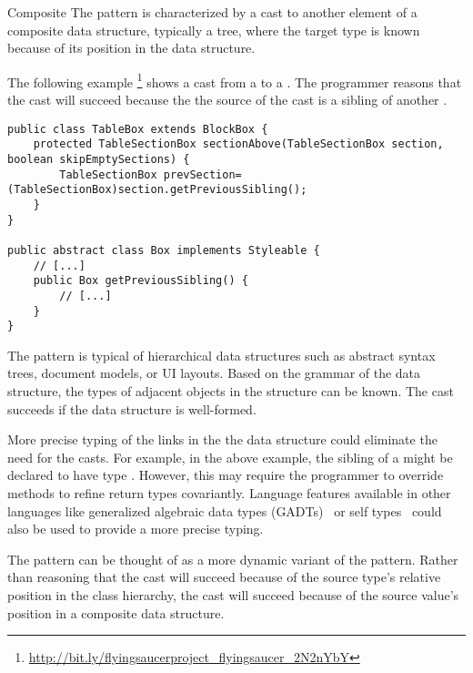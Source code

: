 \begin{pattern}{Composite}
The \thisp{} pattern is characterized by a cast to another element of a
composite data structure, typically a tree, where the target type is known because of its
position in the data structure.

\instances{}
The following example%
\footnote{\url{http://bit.ly/flyingsaucerproject_flyingsaucer_2N2nYbY}}
shows a cast from a  to a .
The programmer reasons that the cast will succeed because the 
the source of the cast is a sibling of another .

\begin{verbatim}
public class TableBox extends BlockBox {
    protected TableSectionBox sectionAbove(TableSectionBox section, boolean skipEmptySections) {
        TableSectionBox prevSection=(TableSectionBox)section.getPreviousSibling();
    }
}

public abstract class Box implements Styleable {
    // [...]
    public Box getPreviousSibling() {
        // [...]
    }
}
\end{verbatim}

\discussion{}
The pattern is typical of hierarchical data structures such as abstract syntax
trees, document models, or UI layouts. Based on the grammar of 
the data structure, the types of adjacent objects in the structure can be known.
The cast succeeds if the data structure is well-formed.

More precise typing of the links in the the data structure could 
eliminate the need for the casts. For example, in the above example,
the sibling of a  might be declared to have type
. However, this may require the programmer to override
methods to refine return types covariantly.
Language features available in other languages like generalized algebraic data types
  (GADTs)~\cite{gadts} or self types~\cite{bruceChallengingTypingIssues2003,scalaIndependentlyExtensible} could also be 
used to provide a more precise typing.

The pattern can be thought of as a more dynamic variant of the
 pattern. Rather than
reasoning that the cast will succeed because of the source type's relative position in the 
class hierarchy, the cast will succeed because of the source value's position
in a composite data structure.

\end{pattern}
